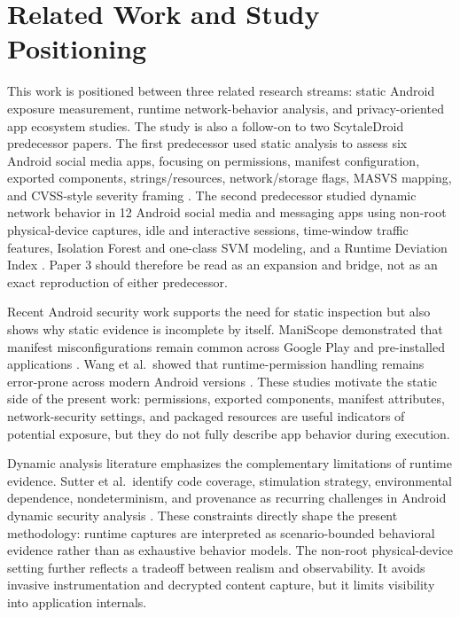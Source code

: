 \section{Related Work and Study Positioning}

This work is positioned between three related research streams: static Android exposure measurement, runtime network-behavior analysis, and privacy-oriented app ecosystem studies. The study is also a follow-on to two ScytaleDroid predecessor papers. The first predecessor used static analysis to assess six Android social media apps, focusing on permissions, manifest configuration, exported components, strings/resources, network/storage flags, MASVS mapping, and CVSS-style severity framing \cite{day2025staticSocial}. The second predecessor studied dynamic network behavior in 12 Android social media and messaging apps using non-root physical-device captures, idle and interactive sessions, time-window traffic features, Isolation Forest and one-class SVM modeling, and a Runtime Deviation Index \cite{day2026dynamicRdi}. Paper 3 should therefore be read as an expansion and bridge, not as an exact reproduction of either predecessor.

Recent Android security work supports the need for static inspection but also shows why static evidence is incomplete by itself. ManiScope demonstrated that manifest misconfigurations remain common across Google Play and pre-installed applications \cite{yang2022maniscope}. Wang et al.\ showed that runtime-permission handling remains error-prone across modern Android versions \cite{wang2023runtimepermissions}. These studies motivate the static side of the present work: permissions, exported components, manifest attributes, network-security settings, and packaged resources are useful indicators of potential exposure, but they do not fully describe app behavior during execution.

Dynamic analysis literature emphasizes the complementary limitations of runtime evidence. Sutter et al.\ identify code coverage, stimulation strategy, environmental dependence, nondeterminism, and provenance as recurring challenges in Android dynamic security analysis \cite{sutter2024dynamic}. These constraints directly shape the present methodology: runtime captures are interpreted as scenario-bounded behavioral evidence rather than as exhaustive behavior models. The non-root physical-device setting further reflects a tradeoff between realism and observability. It avoids invasive instrumentation and decrypted content capture, but it limits visibility into application internals.

